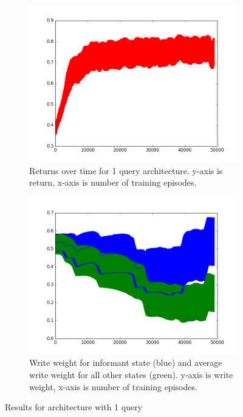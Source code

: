\documentclass{article}
\begin{document}
\begin{figure}[!ht]
\centering
\begin{subfigure}[t]{.45\textwidth}
  \centering
      \includegraphics[width=1\textwidth]{images/1_query_mem_ret.png}
  \caption{Returns over time for 1 query architecture. y-axis is return, x-axis is number of training episodes.}
  \label{fig:1_query_ret}
\end{subfigure}\hfill
\begin{subfigure}[t]{.45\textwidth}
  \centering
      \includegraphics[width=1\textwidth]{images/1_query_mem_writes.png}
  \caption{Write weight for informant state (blue) and average write weight for all other states (green). y-axis is write weight, x-axis is number of training episodes.}
  \label{fig:1_query_write}
\end{subfigure}
\caption{Results for architecture with 1 query}
\label{fig:1_query}
\end{figure}
\end{document}
